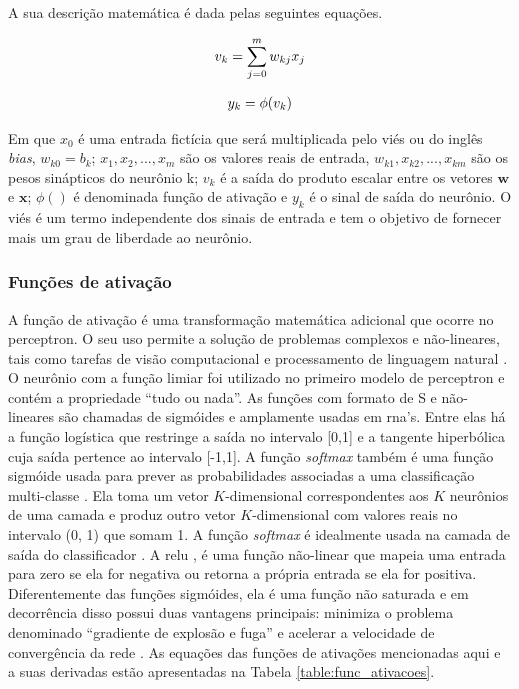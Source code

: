 A sua descrição matemática é dada pelas seguintes equações.

\begin{equation}
\begin{aligned}
\centering    
v_{k} = \sum_{j=0}^{m}w_{kj}x_{j} 
\end{aligned}
\end{equation}


\begin{equation}
\begin{aligned}
\centering    
y_{k} = \phi(v_{k})
\end{aligned}
\end{equation}

Em que $x_{0}$ é uma entrada fictícia que será multiplicada pelo viés ou do inglês \textit{bias}, $w_{k0} = b_{k}$; $x_{1},x_{2}, ...,x_{m}$ são os valores reais de entrada, $w_{k1},x_{k2}, ...,x_{km}$ são os pesos sinápticos do neurônio k; $v_{k}$ é a saída do produto escalar entre os vetores $\textbf{w}$ e $ \textbf{x}$;  $\phi()$ é denominada função de ativação e $y_{k}$ é o sinal de saída do neurônio. O viés é um termo independente dos sinais de entrada e tem o objetivo de fornecer mais um grau de liberdade ao neurônio.


\subsubsection{Funções de ativação}
A função de ativação é uma transformação matemática adicional que ocorre no perceptron. O seu uso permite a solução de problemas complexos e não-lineares, tais como tarefas de visão computacional e processamento de linguagem natural \cite{Mitchell}. 
O neurônio com a função limiar foi utilizado no primeiro modelo de perceptron \cite{mcculloch1943logical,Haykin} e contém a propriedade ``tudo ou nada''.  As funções com formato de S e não-lineares são chamadas de sigmóides e amplamente usadas em \acrshort{rna}'s. Entre elas há a função logística que restringe a saída no intervalo [0,1] e a tangente hiperbólica cuja saída pertence ao intervalo [-1,1]. 
A função \textit{softmax} também é uma função sigmóide usada para prever as probabilidades associadas a uma classificação multi-classe \cite{Goodfellow2016}.  Ela toma um vetor $K$-dimensional correspondentes aos $K$ neurônios de uma camada e produz outro vetor $K$-dimensional com valores reais no intervalo (0, 1) que somam 1.  A função \textit{softmax} é idealmente usada na camada de saída do classificador \cite{Goodfellow2016}.
A \gls{relu} \cite{nair2010rectified}, é uma função não-linear que mapeia uma entrada para zero se ela for negativa ou retorna a própria entrada se ela for positiva. Diferentemente das funções sigmóides, ela é uma função não saturada e em decorrência disso possui duas vantagens principais: minimiza o problema denominado “gradiente de explosão e fuga” e acelerar a velocidade de convergência da rede \cite{xu2015empirical}.
As equações das funções de ativações mencionadas aqui e a suas derivadas estão apresentadas na Tabela \ref{table:func_ativacoes}. 

